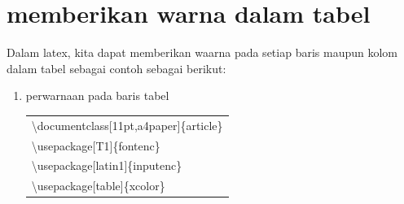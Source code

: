 \section{memberikan warna dalam tabel}
Dalam latex, kita dapat memberikan waarna pada setiap baris maupun kolom dalam tabel sebagai contoh sebagai berikut:\\[0.5cm]
\begin{enumerate}
\newpage
\item perwarnaan pada baris tabel\\
\begin{tabular}{|p{12.5 cm}|}
\hline
\textbackslash documentclass[11pt,a4paper]\{article\}\\
\textbackslash usepackage[T1]\{fontenc\}\\
\textbackslash usepackage[latin1]\{inputenc\}\\
\textbackslash usepackage[table]\{xcolor\}\\    %


\end{tabular}
\end{enumerate}
